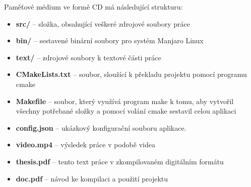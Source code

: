 Paměťové médium ve formě CD má následující strukturu:

\begin{itemize}
    \item \textbf{src/} -- složka, obsahující veškeré zdrojové soubory práce
    \item \textbf{bin/} -- sestavené binární soubory pro systém Manjaro Linux
    \item \textbf{text/} -- zdrojové soubory k textové části práce
    \item \textbf{CMakeLists.txt} -- soubor, sloužící k překladu projektu pomocí programu cmake
    \item \textbf{Makefile} -- soubor, který využívá program make k tomu, aby vytvořil všechny potřebané složky a pomocí volání cmake sestavil celou aplikaci
    \item \textbf{config.json} -- ukázkový konfigurační souboru aplikace.
    \item \textbf{video.mp4} -- výsledek práce v podobě videa
    \item \textbf{thesis.pdf} -- tento text práce v zkompilovaném digitálním formátu
    \item \textbf{doc.pdf} -- návod ke kompilaci a použití projektu
\end{itemize}